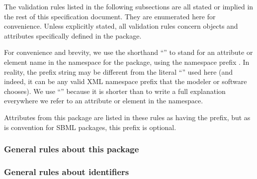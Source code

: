 The validation rules listed in the following subsections are all stated
or implied in the rest of this specification document. They are
enumerated here for convenience. Unless explicitly stated, all
validation rules concern objects and attributes specifically defined in
the \DistributionsPackage package.

For \notice convenience and brevity, we use the shorthand
``'' to stand for an attribute or element name
 in the namespace for the \DistributionsPackage package, using
the namespace prefix . In reality, the prefix string may
be different from the literal ``'' used here (and indeed,
it can be any valid XML namespace prefix that the modeler or software
chooses). We use ``'' because it is shorter than to
write a full explanation everywhere we refer to an attribute or element
in the \DistributionsPackage namespace.

Attributes from this package are listed in these rules as having the  prefix, but as is convention for SBML packages, this prefix is optional.

\subsubsection*{General rules about this package}



\subsubsection*{General rules about identifiers}


